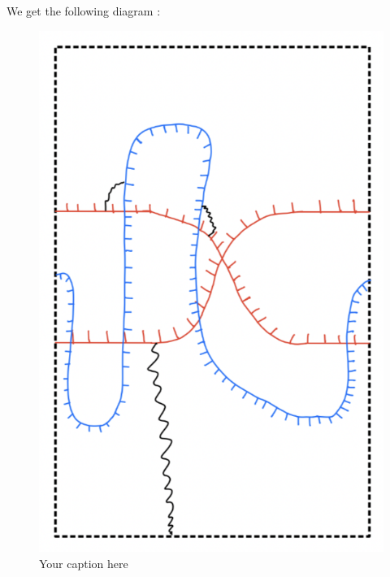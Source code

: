 We get the following diagram :
\begin{figure}[H] %
    \centering
    \includegraphics[scale=0.95]{diagrams/lemma9/6.png} %
    \caption{Your caption here}
    \label{fig:your-label}
\end{figure}

